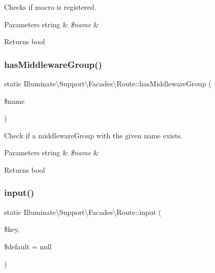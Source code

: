 Checks if macro is registered.


\begin{DoxyParams}[1]{Parameters}
string & {\em \$name} & \\
\hline
\end{DoxyParams}
\begin{DoxyReturn}{Returns}
bool 
\end{DoxyReturn}
\mbox{\label{class_illuminate_1_1_support_1_1_facades_1_1_route_abf3af941c9614b377ce6d798aaa671a6}} 
\subsubsection{\texorpdfstring{has\+Middleware\+Group()}{hasMiddlewareGroup()}}
{\footnotesize\ttfamily static Illuminate\textbackslash{}\+Support\textbackslash{}\+Facades\textbackslash{}\+Route\+::has\+Middleware\+Group (\begin{DoxyParamCaption}\item[{}]{\$name }\end{DoxyParamCaption})\hspace{0.3cm}{\ttfamily [static]}}

Check if a middleware\+Group with the given name exists.


\begin{DoxyParams}[1]{Parameters}
string & {\em \$name} & \\
\hline
\end{DoxyParams}
\begin{DoxyReturn}{Returns}
bool 
\end{DoxyReturn}
\mbox{\label{class_illuminate_1_1_support_1_1_facades_1_1_route_ab0ac1edc61bd2c5428d0470857d257b5}} 
\subsubsection{\texorpdfstring{input()}{input()}}
{\footnotesize\ttfamily static Illuminate\textbackslash{}\+Support\textbackslash{}\+Facades\textbackslash{}\+Route\+::input (\begin{DoxyParamCaption}\item[{}]{\$key,  }\item[{}]{\$default = {\ttfamily null} }\end{DoxyParamCaption})\hspace{0.3cm}{\ttfamily [static]}}

